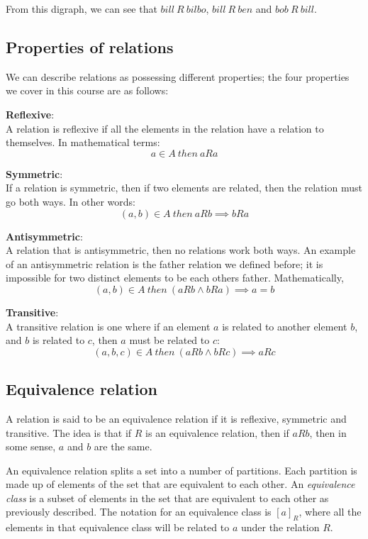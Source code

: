 From this digraph, we can see that $bill~R~bilbo$, $bill~R~ben$ and
$bob~R~bill$.

\subsection{Properties of relations}

We can describe relations as possessing different properties; the four properties
we cover in this course are as follows:

\begin{description}
	\item {\bf Reflexive}:\\
		A relation is reflexive if all the elements in the relation have a
		relation to themselves. In mathematical terms:
		\[
			a \in A~then~aRa
		\]
	\item {\bf Symmetric}:\\
		If a relation is symmetric, then if two elements are related, then the
		relation must go both ways. In other words:
		\[
			(a,b) \in A~then~aRb \implies bRa
		\]
	\item {\bf Antisymmetric}:\\
		A relation that is antisymmetric, then no relations work both ways. An
		example of an antisymmetric relation is the father relation we defined
		before; it is impossible for two distinct elements to be each others
		father. Mathematically, 
		\[
			(a,b) \in A~then~(aRb \wedge bRa) \implies a=b
		\]
	\item {\bf Transitive}:\\
		A transitive relation is one where if an element $a$ is related to
		another element $b$, and $b$ is related to $c$, then $a$ must be related
		to $c$:
		\[
			(a,b,c) \in A~then~(aRb \wedge bRc) \implies aRc
		\]
\end{description}

\subsection{Equivalence relation}

A relation is said to be an equivalence relation if it is reflexive, symmetric
and transitive. The idea is that if $R$ is an equivalence relation, then if
$aRb$, then in some sense, $a$ and $b$ are the same.

An equivalence relation splits a set into a number of partitions. Each partition
is made up of elements of the set that are equivalent to each other. An {\it
equivalence class} is a subset of elements in the set that are equivalent to
each other as previously described. The notation for an equivalence class is
$[a]_R$, where all the elements in that equivalence class will be related to
$a$ under the relation $R$.

